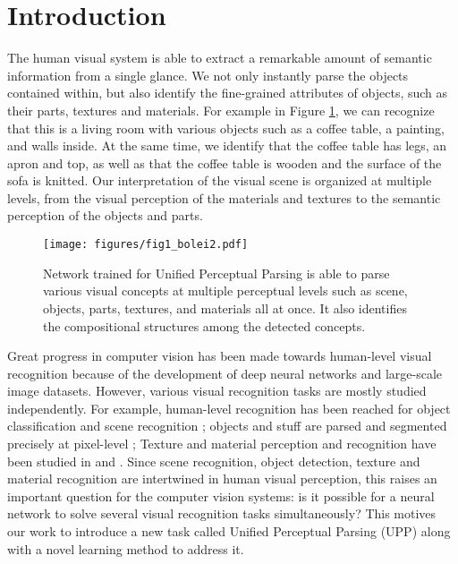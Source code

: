 \documentclass[runningheads]{llncs}
\begin{document}
\section{Introduction}



The human visual system is able to extract a remarkable amount of semantic information from a single glance. We not only instantly parse the objects contained within, but also identify the fine-grained attributes of objects, such as their parts, textures and materials. For example in Figure \ref{teaser}, we can recognize that this is a living room with various objects such as a coffee table, a painting, and walls inside. At the same time, we identify that the coffee table has legs, an apron and top, as well as that the coffee table is wooden and the surface of the sofa is knitted. Our interpretation of the visual scene is organized at multiple levels, from the visual perception of the materials and textures to the semantic perception of the objects and parts. 

\begin{figure}[!t]
\centering
\texttt{[image: figures/fig1\_bolei2.pdf]}
\caption{Network trained for Unified Perceptual Parsing is able to parse various visual concepts at multiple perceptual levels such as scene, objects, parts, textures, and materials all at once. It also identifies the compositional structures among the detected concepts.}
\label{teaser}
\end{figure}

Great progress in computer vision has been made towards human-level visual recognition because of the development of deep neural networks and large-scale image datasets. However, various visual recognition tasks are mostly studied independently. For example, human-level recognition has been reached for object classification \cite{he2016deep} and scene recognition \cite{zhou2017scene}; objects and stuff are parsed and segmented precisely at pixel-level \cite{hu2017learning,zhou2017scene}; Texture and material perception and recognition have been studied in \cite{cimpoi2014describing} and \cite{liu2010exploring}. Since scene recognition, object detection, texture and material recognition are intertwined in human visual perception, this raises an important question for the computer vision systems: is it possible for a neural network to solve several visual recognition tasks simultaneously? This motives our work to introduce a new task called Unified Perceptual Parsing (UPP) along with a novel learning method to address it. 
\end{document}

